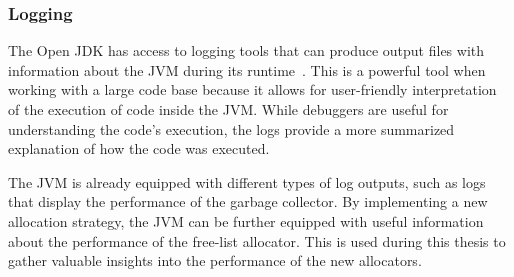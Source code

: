 \subsubsection{Logging}
The Open JDK has access to logging tools that can produce output files with information about the JVM during its runtime~\cite{java:logs}. This is a powerful tool when working with a large code base because it allows for user-friendly interpretation of the execution of code inside the JVM. While debuggers are useful for understanding the code's execution, the logs provide a more summarized explanation of how the code was executed. 

The JVM is already equipped with different types of log outputs, such as logs that display the performance of the garbage collector. By implementing a new allocation strategy, the JVM can be further equipped with useful information about the performance of the free-list allocator. This is used during this thesis to gather valuable insights into the performance of the new allocators.